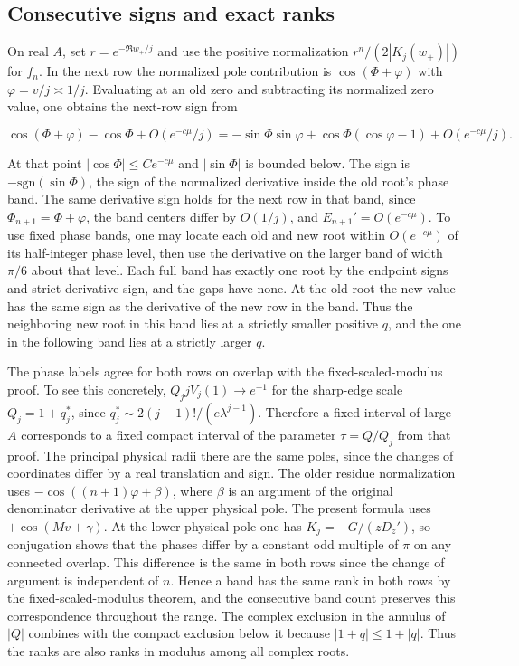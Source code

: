 \documentclass[11pt]{article}
\begin{document}
\subsection{Consecutive signs and exact ranks}
\label{sec:consecutive-signs-and-exact-ranks}

On real \(A\), set \(r=e^{-\Re w_+/j}\) and use the positive normalization \(r^n/(2|K_j(w_+)|)\) for \(f_n\). In the next row the normalized pole contribution is \(\cos(\Phi+\varphi)\) with \(\varphi=v/j\asymp1/j\). Evaluating at an old zero and subtracting its normalized zero value, one obtains the next-row sign from

\begin{equation*}
\cos(\Phi+\varphi)-\cos\Phi+O(e^{-c\mu}/j)
=-\sin\Phi\sin\varphi+\cos\Phi(\cos\varphi-1)+O(e^{-c\mu}/j).
\end{equation*}

At that point \(|\cos\Phi|\le C e^{-c\mu}\) and \(|\sin\Phi|\) is bounded below. The sign is \(-\mathrm{sgn}(\sin\Phi)\), the sign of the normalized derivative inside the old root's phase band. The same derivative sign holds for the next row in that band, since \(\Phi_{n+1}=\Phi+\varphi\), the band centers differ by \(O(1/j)\), and \(E_{n+1}'=O(e^{-c\mu})\). To use fixed phase bands, one may locate each old and new root within \(O(e^{-c\mu})\) of its half-integer phase level, then use the derivative on the larger band of width \(\pi/6\) about that level. Each full band has exactly one root by the endpoint signs and strict derivative sign, and the gaps have none. At the old root the new value has the same sign as the derivative of the new row in the band. Thus the neighboring new root in this band lies at a strictly smaller positive \(q\), and the one in the following band lies at a strictly larger \(q\).

The phase labels agree for both rows on overlap with the fixed-scaled-modulus proof. To see this concretely, \(Q_j jV_j(1)\to e^{-1}\) for the sharp-edge scale \(Q_j=1+q_j^*\), since \(q_j^*\sim2(j-1)!/(e\lambda^{j-1})\). Therefore a fixed interval of large \(A\) corresponds to a fixed compact interval of the parameter \(\tau=Q/Q_j\) from that proof. The principal physical radii there are the same poles, since the changes of coordinates differ by a real translation and sign. The older residue normalization uses \(-\cos((n+1)\varphi+\beta)\), where \(\beta\) is an argument of the original denominator derivative at the upper physical pole. The present formula uses \(+\cos(Mv+\gamma)\). At the lower physical pole one has \(K_j=-G/(zD_z')\), so conjugation shows that the phases differ by a constant odd multiple of \(\pi\) on any connected overlap. This difference is the same in both rows since the change of argument is independent of \(n\). Hence a band has the same rank in both rows by the fixed-scaled-modulus theorem, and the consecutive band count preserves this correspondence throughout the range. The complex exclusion in the annulus of \(|Q|\) combines with the compact exclusion below it because \(|1+q|\le1+|q|\). Thus the ranks are also ranks in modulus among all complex roots.
\end{document}
